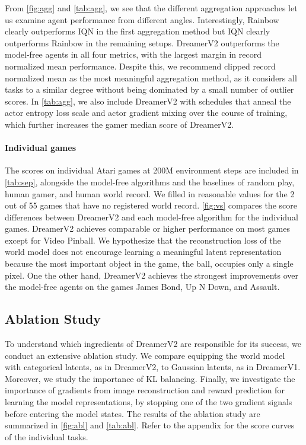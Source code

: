 From \cref{fig:agg} and \cref{tab:agg}, we see that the different aggregation approaches let us examine agent performance from different angles. Interestingly, Rainbow clearly outperforms IQN in the first aggregation method but IQN clearly outperforms Rainbow in the remaining setups. DreamerV2 outperforms the model-free agents in all four metrics, with the largest margin in record normalized mean performance. Despite this, we recommend clipped record normalized mean as the most meaningful aggregation method, as it considers all tasks to a similar degree without being dominated by a small number of outlier scores. In \cref{tab:agg}, we also include DreamerV2 with schedules that anneal the actor entropy loss scale and actor gradient mixing over the course of training, which further increases the gamer median score of DreamerV2.

\paragraph{Individual games}

The scores on individual Atari games at 200M environment steps are included in \cref{tab:sep}, alongside the model-free algorithms and the baselines of random play, human gamer, and human world record. We filled in reasonable values for the 2 out of 55 games that have no registered world record. \cref{fig:vs} compares the score differences between DreamerV2 and each model-free algorithm for the individual games. DreamerV2 achieves comparable or higher performance on most games except for Video Pinball. We hypothesize that the reconstruction loss of the world model does not encourage learning a meaningful latent representation because the most important object in the game, the ball, occupies only a single pixel. One the other hand, DreamerV2 achieves the strongest improvements over the model-free agents on the games James Bond, Up N Down, and Assault.



\raggedbottom\pagebreak  %

\subsection{Ablation Study}



To understand which ingredients of DreamerV2 are responsible for its success, we conduct an extensive ablation study. We compare equipping the world model with categorical latents, as in DreamerV2, to Gaussian latents, as in DreamerV1. Moreover, we study the importance of KL balancing. Finally, we investigate the importance of gradients from image reconstruction and reward prediction for learning the model representations, by stopping one of the two gradient signals before entering the model states. The results of the ablation study are summarized in \cref{fig:abl} and \cref{tab:abl}. Refer to the appendix for the score curves of the individual tasks.

